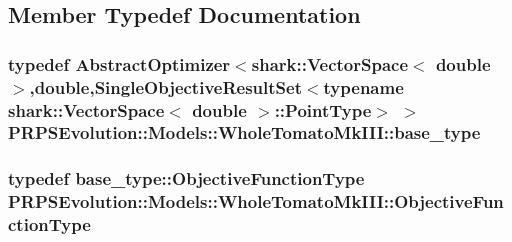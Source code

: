 \subsection{\-Member \-Typedef \-Documentation}
\hypertarget{struct_p_r_p_s_evolution_1_1_models_1_1_whole_tomato_mk_i_i_i_af8af1233b8b6856f203b8221e7bf8c17}{
\subsubsection[{base\-\_\-type}]{\setlength{\rightskip}{0pt plus 5cm}typedef \-Abstract\-Optimizer$<$shark\-::\-Vector\-Space$<$ double $>$,double,\-Single\-Objective\-Result\-Set$<$typename shark\-::\-Vector\-Space$<$ double $>$\-::\-Point\-Type$>$ $>$ {\bf \-P\-R\-P\-S\-Evolution\-::\-Models\-::\-Whole\-Tomato\-Mk\-I\-I\-I\-::base\-\_\-type}}}\label{struct_p_r_p_s_evolution_1_1_models_1_1_whole_tomato_mk_i_i_i_af8af1233b8b6856f203b8221e7bf8c17}
\hypertarget{struct_p_r_p_s_evolution_1_1_models_1_1_whole_tomato_mk_i_i_i_a6e749ad14992120fc55c0064c508ca88}{
\subsubsection[{\-Objective\-Function\-Type}]{\setlength{\rightskip}{0pt plus 5cm}typedef base\-\_\-type\-::\-Objective\-Function\-Type {\bf \-P\-R\-P\-S\-Evolution\-::\-Models\-::\-Whole\-Tomato\-Mk\-I\-I\-I\-::\-Objective\-Function\-Type}}}\label{struct_p_r_p_s_evolution_1_1_models_1_1_whole_tomato_mk_i_i_i_a6e749ad14992120fc55c0064c508ca88}



